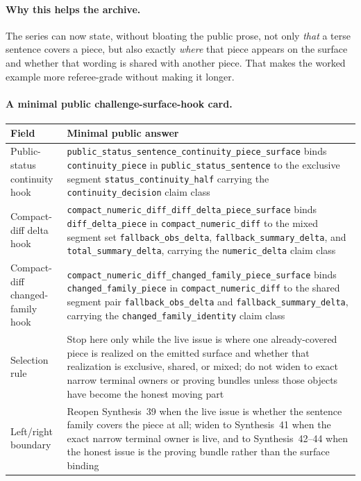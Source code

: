 \documentclass[11pt]{article}
\begin{document}
\paragraph{Why this helps the archive.}
The series can now state, without bloating the public prose, not only \emph{that} a terse sentence covers a piece, but also exactly \emph{where} that piece appears on the surface and whether that wording is shared with another piece.
That makes the worked example more referee-grade without making it longer.

\paragraph{A minimal public challenge-surface-hook card.}
\begin{table}[t]
\centering
\small
\begin{tabularx}{\linewidth}{@{}lX@{}}
\toprule
Field & Minimal public answer \\
\midrule
Public-status continuity hook & \nolinkurl{public_status_sentence_continuity_piece_surface} binds \nolinkurl{continuity_piece} in \nolinkurl{public_status_sentence} to the exclusive segment \nolinkurl{status_continuity_half} carrying the \nolinkurl{continuity_decision} claim class \\
Compact-diff delta hook & \nolinkurl{compact_numeric_diff_diff_delta_piece_surface} binds \nolinkurl{diff_delta_piece} in \nolinkurl{compact_numeric_diff} to the mixed segment set \nolinkurl{fallback_obs_delta}, \nolinkurl{fallback_summary_delta}, and \nolinkurl{total_summary_delta}, carrying the \nolinkurl{numeric_delta} claim class \\
Compact-diff changed-family hook & \nolinkurl{compact_numeric_diff_changed_family_piece_surface} binds \nolinkurl{changed_family_piece} in \nolinkurl{compact_numeric_diff} to the shared segment pair \nolinkurl{fallback_obs_delta} and \nolinkurl{fallback_summary_delta}, carrying the \nolinkurl{changed_family_identity} claim class \\
Selection rule & Stop here only while the live issue is where one already-covered piece is realized on the emitted surface and whether that realization is exclusive, shared, or mixed; do not widen to exact narrow terminal owners or proving bundles unless those objects have become the honest moving part \\
Left/right boundary & Reopen Synthesis~39 when the live issue is whether the sentence family covers the piece at all; widen to Synthesis~41 when the exact narrow terminal owner is live, and to Synthesis~42--44 when the honest issue is the proving bundle rather than the surface binding \\

\end{tabularx}
\end{table}
\end{document}
